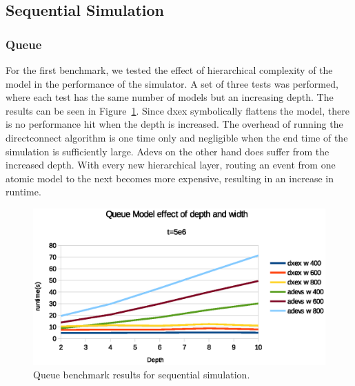 \subsection{Sequential Simulation}

\subsubsection{Queue}
\label{4-seq-Queue}
For the first benchmark, we tested the effect of hierarchical complexity of the model in the performance of the simulator.
A set of three tests was performed, where each test has the same number of models but an increasing depth.
The results can be seen in Figure~\ref{fig:Queue_benchmark_seq}.
Since dxex symbolically flattens the model, there is no performance hit when the depth is increased.
The overhead of running the directconnect algorithm is one time only and negligible when the end time of the simulation is sufficiently large.
Adevs on the other hand does suffer from the increased depth.
With every new hierarchical layer, routing an event from one atomic model to the next becomes more expensive, resulting in an increase in runtime.
\begin{figure}
	\center
	\includegraphics[width=\plotfraction\columnwidth]{fig/queue_fixed_sequential.eps}
	\caption{Queue benchmark results for sequential simulation.}
	\label{fig:Queue_benchmark_seq}
\end{figure}


